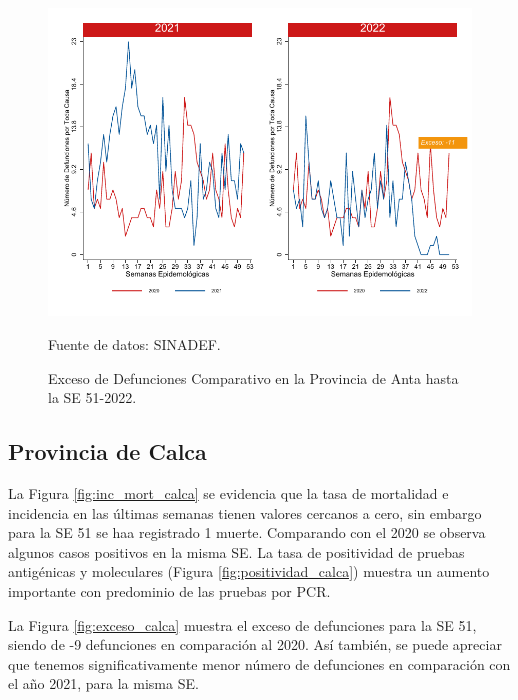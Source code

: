 \documentclass[12pt,a4paper,openany]{book}
\begin{document}
	\begin{figure}[h]
		\caption{Exceso de Defunciones Comparativo en la Provincia de Anta hasta la SE 51-2022.}\label{fig:exceso_anta}
		\begin{center}
			\includegraphics[width=0.7\linewidth]{../figuras/exceso_2.pdf}
		\end{center}
		{\footnotesize {Fuente de datos: SINADEF.}}
	\end{figure}
	
	\clearpage
	
	\subsection*{Provincia de Calca}
	\noindent La Figura \ref{fig:inc_mort_calca} se evidencia que la tasa de mortalidad e incidencia en las últimas semanas tienen valores cercanos a cero, sin embargo para la SE 51 se haa registrado 1 muerte. Comparando con el 2020 se observa algunos casos positivos en la misma SE. La tasa de positividad de pruebas antigénicas y moleculares (Figura \ref{fig:positividad_calca}) muestra un aumento importante con predominio de las pruebas por PCR.
	
	La Figura \ref{fig:exceso_calca} muestra el exceso de defunciones para la SE 51, siendo de -9 defunciones en comparación al 2020. Así también, se puede apreciar que tenemos significativamente menor número de defunciones en comparación con el año 2021, para la misma SE.
	
\end{document}

